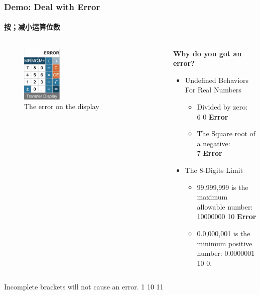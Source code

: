 \documentclass[
	11pt, %
]{beamer}
\begin{document}
\begin{frame}
	\frametitle{Demo: Deal with Error}
	\framesubtitle{按；减小运算位数}
	\begin{columns}[t]
				\begin{column}{0.3\textwidth}
			   \begin{figure}
				    \includegraphics[width=0.3\textwidth]{GRE_Calculator_Error.png}
				    \caption{The error on the display}
			    \end{figure}
			\end{column}
			
	        \begin{column}{0.7\textwidth}
	        \textbf{Why do you  got an error?}
		        \begin{itemize}
							\item Undefined Behaviors For Real Numbers
							\begin{itemize}
								\item Divided by zero:\\ 6 \fbox{$\div$}0 \fbox{=} \textbf{Error}
								\item The Square root of a negative:\\ 7 \fbox{$\pm$} \fbox{$\sqrt{}$}  \textbf{Error}
							\end{itemize}
							\item The 8-Digits Limit
							\begin{itemize}
								\item 99,999,999 is the maximum allowable number:\\ 10000000 \fbox{$\times$} 10 \fbox{=} \textbf{Error}
								\item 0.0,000,001 is the minimum positive number: 0.0000001 \fbox{$\div$} 10 \fbox{=} 0.
							\end{itemize}
				   \end{itemize}
			\end{column}
	\end{columns}
	\bigskip
	Incomplete brackets will not cause an error. 1 \fbox{+} \fbox{$($} 10 \fbox{=} 11
\end{frame}
\end{document}
